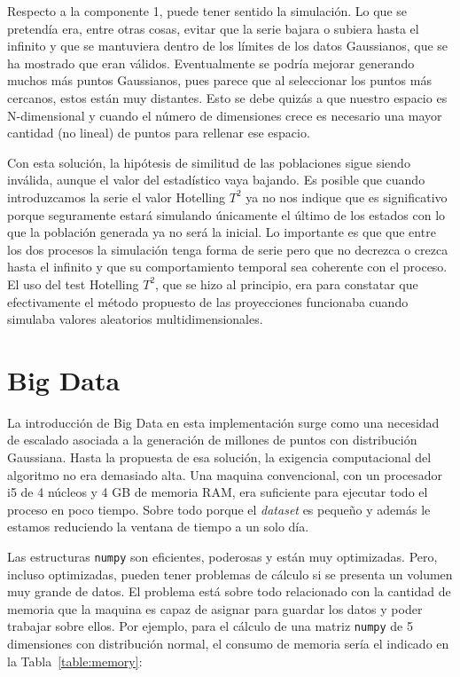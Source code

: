 \documentclass[11pt,spanish,listoffigures,listoftables]{tfgetsinf}
\begin{document}
        Respecto a la componente 1, puede tener sentido la simulación. Lo que se pretendía era, entre otras cosas, evitar que la serie bajara o subiera hasta el infinito y que se mantuviera dentro de los límites de los datos Gaussianos, que se ha mostrado que eran válidos. Eventualmente se podría mejorar generando muchos más puntos Gaussianos, pues parece que al seleccionar los puntos más cercanos, estos están muy distantes. Esto se debe quizás a que nuestro espacio es N-dimensional y cuando el número de dimensiones crece es necesario una mayor cantidad (no lineal) de puntos para rellenar ese espacio.

        Con esta solución, la hipótesis de similitud de las poblaciones sigue siendo inválida, aunque el valor del estadístico vaya bajando. Es posible que cuando introduzcamos la serie el valor Hotelling \(T^2\) ya no nos indique que es significativo porque seguramente estará simulando únicamente el último de los estados con lo que la población generada ya no será la inicial. Lo importante es que que entre los dos procesos la simulación tenga forma de serie pero que no decrezca o crezca hasta el infinito y que su comportamiento temporal sea coherente con el proceso. El uso del test Hotelling \(T^2\), que se hizo al principio, era para constatar que efectivamente el método propuesto de las proyecciones funcionaba cuando simulaba valores aleatorios multidimensionales. 

	
        \section{Big Data}
        La introducción de Big Data en esta implementación surge como una necesidad de escalado asociada a la generación de millones de puntos con distribución Gaussiana. Hasta la propuesta de esa solución, la exigencia computacional del algoritmo no era demasiado alta. Una maquina convencional, con un procesador i5 de 4 núcleos y 4 GB de memoria RAM, era suficiente para ejecutar todo el proceso en poco tiempo. Sobre todo porque el {\em dataset} es pequeño y además le estamos reduciendo la ventana de tiempo a un solo día. 
        
        Las estructuras {\tt numpy} son eficientes, poderosas y están muy optimizadas. Pero, incluso optimizadas, pueden tener problemas de cálculo si se presenta un volumen muy grande de datos. El problema está sobre todo relacionado con la cantidad de memoria que la maquina es capaz de asignar para guardar los datos y poder trabajar sobre ellos. Por ejemplo, para el cálculo de una matriz {\tt numpy} de 5 dimensiones con distribución normal, el consumo de memoria sería el indicado en la Tabla~\ref{table:memory}:
        
\end{document}
